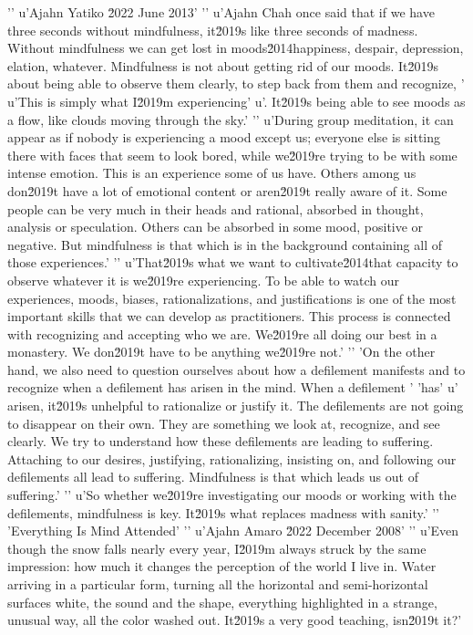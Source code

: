 '\n'
u'Ajahn Yatiko \u2022 June 2013'
'\n'
u'Ajahn Chah once said that if we have three seconds without mindfulness, it\u2019s like three seconds of madness. Without mindfulness we can get lost in moods\u2014happiness, despair, depression, elation, whatever. Mindfulness is not about getting rid of our moods. It\u2019s about being able to observe them clearly, to step back from them and recognize, '
u'This is simply what I\u2019m experiencing'
u'. It\u2019s being able to see moods as a flow, like clouds moving through the sky.'
'\n'
u'During group meditation, it can appear as if nobody is experiencing a mood except us; everyone else is sitting there with faces that seem to look bored, while we\u2019re trying to be with some intense emotion. This is an experience some of us have. Others among us don\u2019t have a lot of emotional content or aren\u2019t really aware of it. Some people can be very much in their heads and rational, absorbed in thought, analysis or speculation. Others can be absorbed in some mood, positive or negative. But mindfulness is that which is in the background containing all of those experiences.'
'\n'
u'That\u2019s what we want to cultivate\u2014that capacity to observe whatever it is we\u2019re experiencing. To be able to watch our experiences, moods, biases, rationalizations, and justifications is one of the most important skills that we can develop as practitioners. This process is connected with recognizing and accepting who we are. We\u2019re all doing our best in a monastery. We don\u2019t have to be anything we\u2019re not.'
'\n'
'On the other hand, we also need to question ourselves about how a defilement manifests and to recognize when a defilement has arisen in the mind. When a defilement '
'has'
u' arisen, it\u2019s unhelpful to rationalize or justify it. The defilements are not going to disappear on their own. They are something we look at, recognize, and see clearly. We try to understand how these defilements are leading to suffering. Attaching to our desires, justifying, rationalizing, insisting on, and following our defilements all lead to suffering. Mindfulness is that which leads us out of suffering.'
'\n'
u'So whether we\u2019re investigating our moods or working with the defilements, mindfulness is key. It\u2019s what replaces madness with sanity.'
'\n'
'Everything Is Mind Attended'
'\n'
u'Ajahn Amaro \u2022 December 2008'
'\n'
u'Even though the snow falls nearly every year, I\u2019m always struck by the same impression: how much it changes the perception of the world I live in. Water arriving in a particular form, turning all the horizontal and semi-horizontal surfaces white, the sound and the shape, everything highlighted in a strange, unusual way, all the color washed out. It\u2019s a very good teaching, isn\u2019t it?'
